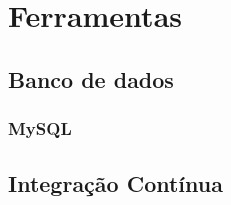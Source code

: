 \chapter{Ferramentas}

\section{Banco de dados}

\subsection{MySQL}

\section{Integração Contínua}

